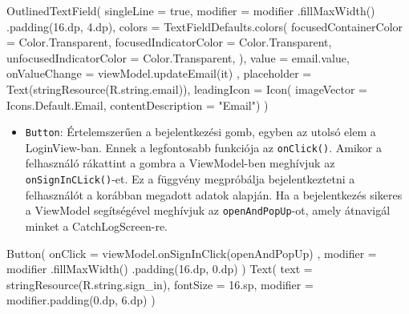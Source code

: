 \begin{java}[caption = {Az OutlinedTextField szemléltetése.}]
OutlinedTextField(
        singleLine = true,
        modifier = modifier
            .fillMaxWidth()
            .padding(16.dp, 4.dp),
        colors = TextFieldDefaults.colors(
            focusedContainerColor = Color.Transparent,
            focusedIndicatorColor = Color.Transparent,
            unfocusedIndicatorColor = Color.Transparent,
        ),
        value = email.value,
        onValueChange = { viewModel.updateEmail(it) },
        placeholder = { Text(stringResource(R.string.email))},
        leadingIcon = { Icon(
            imageVector = Icons.Default.Email,
            contentDescription = "Email") }
        )
\end{java}

\begin{itemize}
    \item \texttt{Button}: Értelemszerűen a bejelentkezési gomb, egyben az utolsó elem a 
    \newline
    LoginView-ban. Ennek a legfontosabb funkciója az \texttt{onClick()}. Amikor a felhasználó rákattint a gombra a ViewModel-ben meghívjuk az \texttt{onSignInCLick()}-et.
    Ez a függvény megpróbálja bejelentkeztetni a felhasználót a korábban megadott adatok alapján. Ha a bejelentkezés sikeres a ViewModel segítségével meghívjuk az \texttt{openAndPopUp}-ot, amely átnavigál minket a CatchLogScreen-re.
\end{itemize}

\newpage

\begin{java}[caption = {A Button szemléltetése.}]
Button(
         onClick = { viewModel.onSignInClick(openAndPopUp) },
        modifier = modifier
            .fillMaxWidth()
            .padding(16.dp, 0.dp)
    ) {
        Text(
            text = stringResource(R.string.sign_in),
            fontSize = 16.sp,
            modifier = modifier.padding(0.dp, 6.dp)
        )
    }
\end{java}